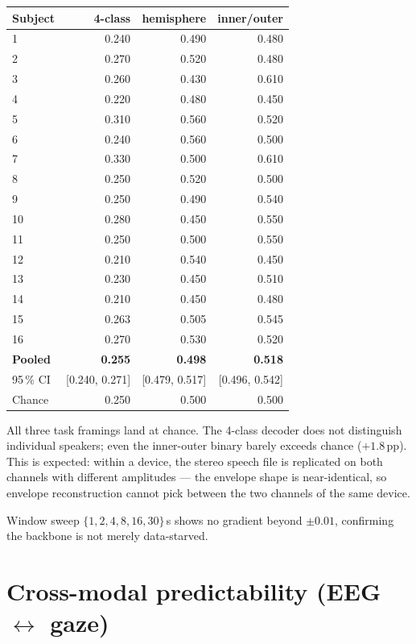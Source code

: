\begin{table}[ht]
\centering
\begin{tabular}{lrrr}
\toprule
Subject & 4-class & hemisphere & inner/outer \\
\midrule
1  & 0.240 & 0.490 & 0.480 \\
2  & 0.270 & 0.520 & 0.480 \\
3  & 0.260 & 0.430 & 0.610 \\
4  & 0.220 & 0.480 & 0.450 \\
5  & 0.310 & 0.560 & 0.520 \\
6  & 0.240 & 0.560 & 0.500 \\
7  & 0.330 & 0.500 & 0.610 \\
8  & 0.250 & 0.520 & 0.500 \\
9  & 0.250 & 0.490 & 0.540 \\
10 & 0.280 & 0.450 & 0.550 \\
11 & 0.250 & 0.500 & 0.550 \\
12 & 0.210 & 0.540 & 0.450 \\
13 & 0.230 & 0.450 & 0.510 \\
14 & 0.210 & 0.450 & 0.480 \\
15 & 0.263 & 0.505 & 0.545 \\
16 & 0.270 & 0.530 & 0.520 \\
\midrule
\textbf{Pooled} & \textbf{0.255}    & \textbf{0.498}    & \textbf{0.518} \\
95\,\% CI       & [0.240, 0.271] & [0.479, 0.517] & [0.496, 0.542] \\
Chance          & 0.250             & 0.500             & 0.500 \\
\bottomrule
\end{tabular}
\end{table}

All three task framings land at chance. The 4-class decoder does not
distinguish individual speakers; even the inner-outer binary barely
exceeds chance ($+1.8$\,pp). This is expected: within a device, the
stereo speech file is replicated on both channels with different
amplitudes --- the envelope shape is near-identical, so envelope
reconstruction cannot pick between the two channels of the same device.

Window sweep $\{1,2,4,8,16,30\}$\,s shows no gradient beyond
$\pm 0.01$, confirming the backbone is not merely data-starved.

\section{Cross-modal predictability (EEG $\leftrightarrow$ gaze)}
\label{sec:iter4-pred}

